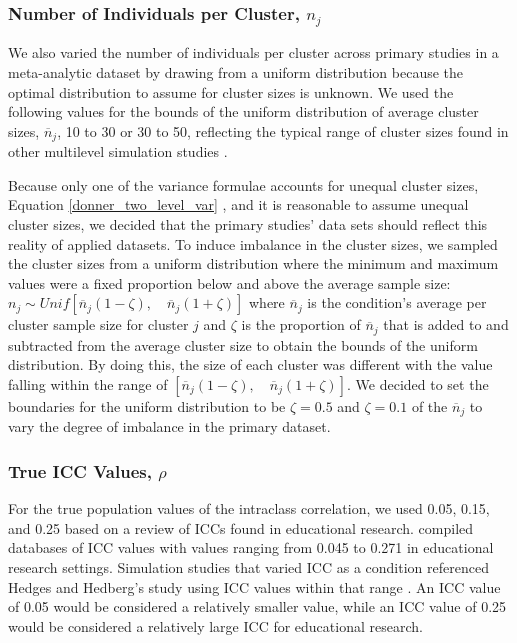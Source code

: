\subsubsection{Number of Individuals per Cluster,  \texorpdfstring{$n_j$}{nj} }
We also varied the number of individuals per cluster across primary studies in a meta-analytic dataset by drawing from a uniform distribution because the optimal distribution to assume for cluster sizes is unknown. We used the following values for the bounds of the uniform distribution of average cluster sizes, $\overline{n}_j$, 10 to 30 or 30 to 50, reflecting the typical range of cluster sizes found in other multilevel simulation studies \cite{mcneish2016, hsu2017}. 

Because only one of the variance formulae accounts for unequal cluster sizes, Equation \ref{donner_two_level_var} \cite{donner1980}, and it is reasonable to assume unequal cluster sizes, we decided that the primary studies' data sets should reflect this reality of applied datasets. To induce imbalance in the cluster sizes, we sampled the cluster sizes from a uniform distribution where the minimum and maximum values were a fixed proportion below and above the average sample size: $n_j \sim Unif[\overline{n}_j(1-\zeta),\quad   \overline{n}_j(1+\zeta)]$ where $\overline{n}_j$ is the condition's average per cluster sample size for cluster $j$ and $\zeta$ is the proportion of $\overline{n}_j$ that is added to and subtracted from the average cluster size to obtain the bounds of the uniform distribution. By doing this, the size of each cluster was different with the value falling within the range of $[\overline{n}_j(1-\zeta), \quad  \overline{n}_j(1+\zeta)]$. We decided to set the boundaries for the uniform distribution to be $\zeta = 0.5$ and $\zeta = 0.1$ of the $\overline{n}_j$ to vary the degree of imbalance in the primary dataset. 

\subsubsection{True ICC Values, \texorpdfstring{$\rho$}{r} } For the true population values of the intraclass correlation, we used 0.05, 0.15, and 0.25 based on a review of ICCs found in educational research.  compiled databases of ICC values with values ranging from 0.045 to 0.271 in educational research settings. Simulation studies that varied ICC as a condition referenced Hedges and Hedberg's study \citeyear{hedgesIntraclassCorrelationValues2007a}  using ICC values within that range \cite{mcneish2016, rotondi2009, lai2015}. An ICC  value of 0.05 would be considered a relatively smaller value, while an ICC value of 0.25 would be considered a relatively large ICC for educational research. 



